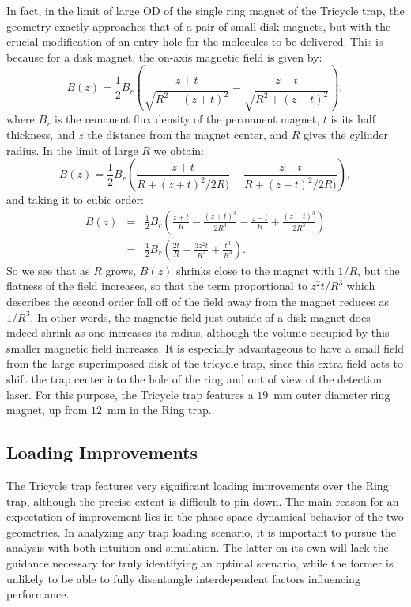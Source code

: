 \documentclass[defaultstyle,11pt]{thesis}
\begin{document}
In fact, in the limit of large OD of the single ring magnet of the Tricycle trap, the geometry exactly approaches that of a pair of small disk magnets, but with the crucial modification of an entry hole for the molecules to be delivered.
This is because for a disk magnet, the on-axis magnetic field is given by:
\begin{equation}
B(z) = \frac{1}{2}B_r\left(\frac{z+t}{\sqrt{R^2+(z+t)^2}} - \frac{z-t}{\sqrt{R^2+(z-t)^2}}    \right),
\end{equation}
where $B_r$ is the remanent flux density of the permanent magnet, $t$ is its half thickness, and $z$ the distance from the magnet center, and $R$ gives the cylinder radius. In the limit of large $R$ we obtain:
\begin{equation}
B(z) = \frac{1}{2}B_r\left( \frac{z+t}{R+(z+t)^2/2R)}  - \frac{z-t}{R+(z-t)^2/2R)}   \right),
\end{equation}
and taking it to cubic order:
\begin{eqnarray}
B(z) &=& \frac{1}{2}B_r\left( \frac{z+t}{R} - \frac{(z+t)^3}{2R^3}  - \frac{z-t}{R} + \frac{(z-t)^3}{2R^3}   \right)\\
&=& \frac{1}{2}B_r\left(\frac{2t}{R} - \frac{3z^2t}{R^3} + \frac{t^3}{R^3} \right).
\end{eqnarray} 
So we see that as $R$ grows, $B(z)$ shrinks close to the magnet with $1/R$, but the flatness of the field increases, so that the term proportional to $z^2t/R^3$ which describes the second order fall off of the field away from the magnet reduces as $1/R^3$.
In other words, the magnetic field just outside of a disk magnet does indeed shrink as one increases its radius, although the volume occupied by this smaller magnetic field increases.
It is especially advantageous to have a small field from the large superimposed disk of the tricycle trap, since this extra field acts to shift the trap center into the hole of the ring and out of view of the detection laser.
For this purpose, the Tricycle trap features a $19$~mm outer diameter ring magnet, up from $12$~mm in the Ring trap.

\subsection{Loading Improvements}

The Tricycle trap features very significant loading improvements over the Ring trap, although the precise extent is difficult to pin down. 
The main reason for an expectation of improvement lies in the phase space dynamical behavior of the two geometries.
In analyzing any trap loading scenario, it is important to pursue the analysis with both intuition and simulation.
The latter on its own will lack the guidance necessary for truly identifying an optimal scenario, while the former is unlikely to be able to fully disentangle interdependent factors influencing performance.
\end{document}
